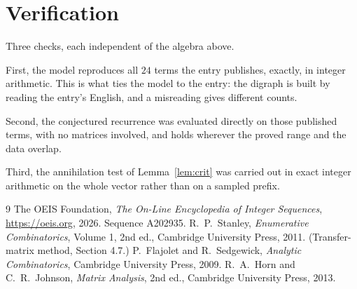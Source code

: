 \documentclass[11pt,a4paper]{article}
\theoremstyle{plain}
\theoremstyle{definition}
\begin{document}
\section{Verification}

Three checks, each independent of the algebra above.

First, the model reproduces all $24$ terms the entry publishes, exactly, in integer
arithmetic. This is what ties the model to the entry: the digraph is built by reading the
entry's English, and a misreading gives different counts.

Second, the conjectured recurrence was evaluated directly on those published terms, with no
matrices involved, and holds wherever the proved range and the data overlap.

Third, the annihilation test of Lemma~\ref{lem:crit} was carried out in exact integer
arithmetic on the whole vector rather than on a sampled prefix.

\begin{thebibliography}{9}
 The OEIS Foundation, \emph{The On-Line Encyclopedia of Integer
Sequences}, \url{https://oeis.org}, 2026. Sequence A202935.
 R.~P.~Stanley, \emph{Enumerative Combinatorics}, Volume 1, 2nd ed.,
Cambridge University Press, 2011. (Transfer-matrix method, Section 4.7.)
 P.~Flajolet and R.~Sedgewick, \emph{Analytic Combinatorics}, Cambridge
University Press, 2009.
 R.~A.~Horn and C.~R.~Johnson, \emph{Matrix Analysis}, 2nd ed., Cambridge
University Press, 2013.
\end{thebibliography}
\end{document}
